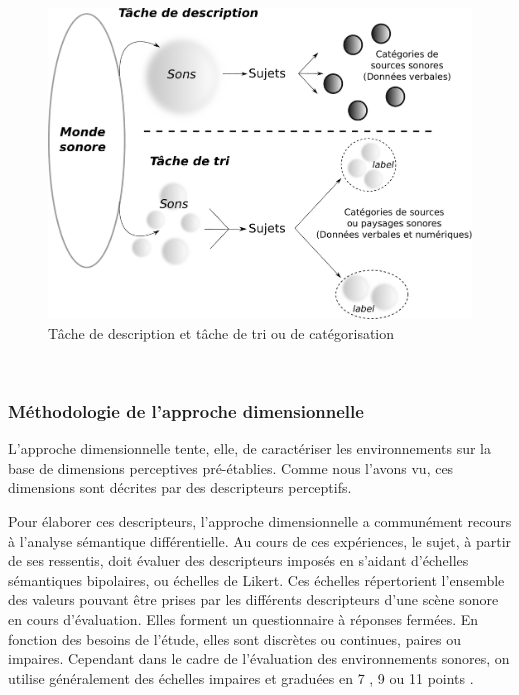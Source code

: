 {\begin{enumerate}
\end{enumerate}

\begin{figure}[t]
        \myfloatalign
        \includegraphics[width=.8\linewidth]{gfx/ch_3/desCat}
        \caption{Tâche de description et tâche de tri ou de catégorisation}\label{fig:descat}
\end{figure}

 \\

\subsubsection{Méthodologie de l'approche dimensionnelle}
\label{sec:appDimensionelle}

L'approche dimensionnelle tente, elle, de caractériser les environnements sur la base de dimensions perceptives pré-établies. Comme nous l'avons vu, ces dimensions sont décrites par des descripteurs perceptifs.

Pour élaborer ces descripteurs, l'approche dimensionnelle a communément recours à l'analyse sémantique différentielle. Au cours de ces expériences, le sujet, à partir de ses ressentis, doit évaluer des descripteurs imposés en s'aidant d'échelles sémantiques bipolaires, ou échelles de Likert. Ces échelles répertorient l'ensemble des valeurs pouvant être prises par les différents descripteurs d'une scène sonore en cours d'évaluation. Elles forment un questionnaire à réponses fermées. En fonction des besoins de l'étude, elles sont discrètes ou continues, paires ou impaires. Cependant dans le cadre de l'évaluation des environnements sonores, on utilise généralement des échelles impaires et graduées en 7 \citep{raimbault2006qualitative}, 9 \citep{hall2013exploratory} ou 11 points \citep{ricciardi2015sound}.

}
